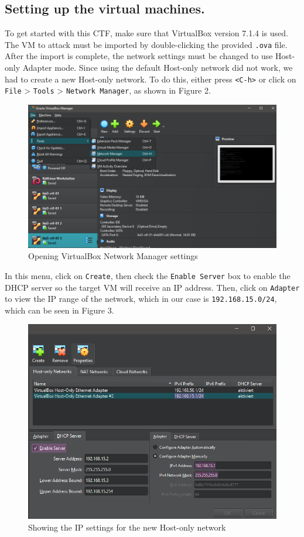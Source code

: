 \documentclass[a4paper]{article}
\newcommand{\abc}{\hfill \break}
\begin{document}
\subsection{Setting up the virtual machines.}
To get started with this CTF, make sure that VirtualBox version 7.1.4 is used. The VM to attack must be imported by double-clicking the provided \texttt{.ova} file. After the import is complete, the network settings must be changed to use Host-only Adapter mode. Since using the default Host-only network did not work, we had to create a new Host-only network. To do this, either press \texttt{<C-h>} or click on \texttt{File} > \texttt{Tools} > \texttt{Network Manager}, as shown in Figure 2.
\begin{figure}[h]
	\includegraphics[scale=0.285]{./images/openingNetworkManager.png}
	\centering
	\caption{Opening VirtualBox Network Manager settings}
\end{figure}\abc
In this menu, click on \texttt{Create}, then check the \texttt{Enable Server} box to enable the DHCP server so the target VM will receive an IP address. Then, click on \texttt{Adapter} to view the IP range of the network, which in our case is \texttt{192.168.15.0/24}, which can be seen in Figure 3.
\begin{figure}[h]
	\includegraphics[scale=0.4]{./images/nwipsfr.png}
	\centering
	\caption{Showing the IP settings for the new Host-only network}
\end{figure}\abc
\end{document}
